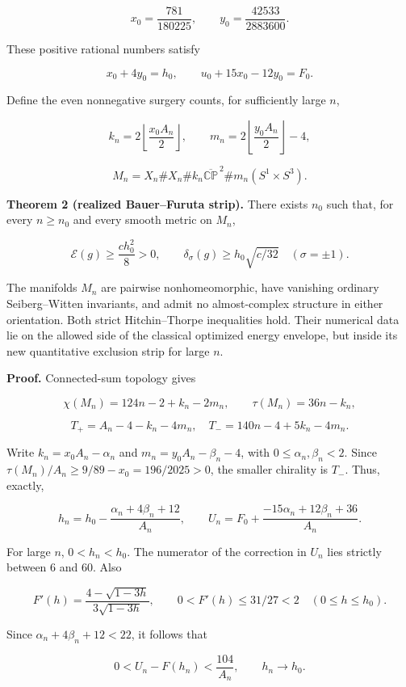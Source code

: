 \documentclass[
  11pt,
]{article}
\begin{document}
\[
 x_0=\frac{781}{180225},\qquad y_0=\frac{42533}{2883600}.
 \tag{11}
\]

These positive rational numbers satisfy

\[
 x_0+4y_0=h_0,\qquad u_0+15x_0-12y_0=F_0.
 \tag{12}
\]

Define the even nonnegative surgery counts, for sufficiently large
\(n\),

\[
 k_n=2\left\lfloor\frac{x_0A_n}{2}\right\rfloor,
 \qquad m_n=2\left\lfloor\frac{y_0A_n}{2}\right\rfloor-4,
\]

\[
 M_n=X_n\#X_n\#k_n\overline{\mathbb{CP}}^{\,2}
                    \#m_n(S^1\times S^3).
 \tag{13}
\]

\textbf{Theorem 2 (realized Bauer--Furuta strip).} There exists \(n_0\)
such that, for every \(n\ge n_0\) and every smooth metric on \(M_n\),

\[
 \boxed{\mathcal E(g)\ge\frac{c h_0^2}{8}>0,\qquad
 \delta_\sigma(g)\ge h_0\sqrt{c/32}\quad(\sigma=\pm1).}
 \tag{14}
\]

The manifolds \(M_n\) are pairwise nonhomeomorphic, have vanishing
ordinary Seiberg--Witten invariants, and admit no almost-complex
structure in either orientation. Both strict Hitchin--Thorpe
inequalities hold. Their numerical data lie on the allowed side of the
classical optimized energy envelope, but inside its new quantitative
exclusion strip for large \(n\).

\textbf{Proof.} Connected-sum topology gives

\[
 \chi(M_n)=124n-2+k_n-2m_n,\qquad \tau(M_n)=36n-k_n,
\]

\[
 T_+=A_n-4-k_n-4m_n,
 \quad T_-=140n-4+5k_n-4m_n.
 \tag{15}
\]

Write \(k_n=x_0A_n-\alpha_n\) and \(m_n=y_0A_n-\beta_n-4\), with
\(0\le\alpha_n,\beta_n<2\). Since
\(\tau(M_n)/A_n\ge9/89-x_0=196/2025>0\), the smaller chirality is
\(T_-\). Thus, exactly,

\[
 h_n=h_0-\frac{\alpha_n+4\beta_n+12}{A_n},\qquad
 U_n=F_0+\frac{-15\alpha_n+12\beta_n+36}{A_n}.
 \tag{16}
\]

For large \(n\), \(0<h_n<h_0\). The numerator of the correction in
\(U_n\) lies strictly between 6 and 60. Also

\[
 F'(h)=\frac{4-\sqrt{1-3h}}{3\sqrt{1-3h}},\qquad
 0<F'(h)\le31/27<2\quad(0\le h\le h_0).
\]

Since \(\alpha_n+4\beta_n+12<22\), it follows that

\[
 \boxed{0<U_n-F(h_n)<\frac{104}{A_n},\qquad h_n\longrightarrow h_0.}
 \tag{17}
\]
\end{document}
